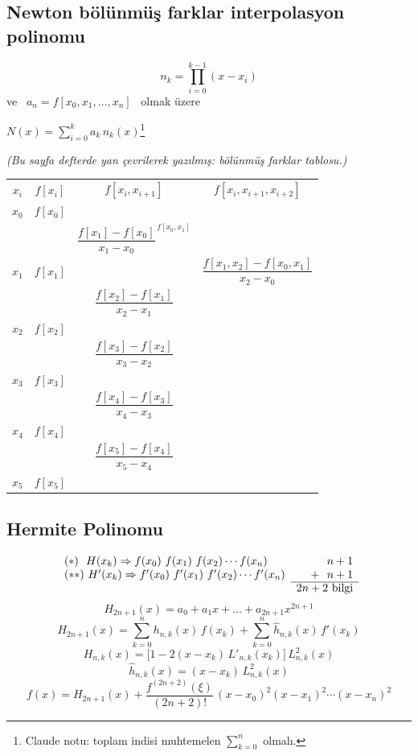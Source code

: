 \documentclass[11pt,a4paper]{article}
\begin{document}
\subsection{Newton bölünmüş farklar interpolasyon polinomu}
\[ n_k = \prod_{i=0}^{k-1} (x - x_i) \]
ve \ $a_n = f[x_0, x_1, \dots, x_n]$ \ olmak üzere
\begin{center}
  $\displaystyle N(x) = \sum_{i=0}^{k} a_k\, n_k(x)$\footnote{Claude notu: toplam indisi muhtemelen
  $\sum_{k=0}^{n}$ olmalı.}
\end{center}

\noindent{}\textit{(Bu sayfa defterde yan çevrilerek yazılmış: bölünmüş farklar tablosu.)}
\begin{center}
  {\renewcommand\arraystretch{1.6}
  \begin{tabular}{cccc}
    $x_i$ & $f[x_i]$ & $f[x_i, x_{i+1}]$ & $f[x_i, x_{i+1}, x_{i+2}]$ \\
    $x_0$ & $f[x_0]$ & & \\
      & & $\boxed{\dfrac{f[x_1] - f[x_0]}{x_1 - x_0}}^{\,f[x_0, x_1]}$ & \\
    $x_1$ & $f[x_1]$ & & $\dfrac{f[x_1, x_2] - f[x_0, x_1]}{x_2 - x_0}$ \\
      & & $\dfrac{f[x_2] - f[x_1]}{x_2 - x_1}$ & \\
    $x_2$ & $f[x_2]$ & & \\
      & & $\dfrac{f[x_3] - f[x_2]}{x_3 - x_2}$ & \\
    $x_3$ & $f[x_3]$ & & \\
      & & $\dfrac{f[x_4] - f[x_3]}{x_4 - x_3}$ & \\
    $x_4$ & $f[x_4]$ & & \\
      & & $\dfrac{f[x_5] - f[x_4]}{x_5 - x_4}$ & \\
    $x_5$ & $f[x_5]$ & &
  \end{tabular}}
\end{center}

\subsection{Hermite Polinomu}
\[
  \begin{array}{lr}
    (*)\ \ H(x_k) \Rightarrow f(x_0)\ f(x_1)\ f(x_2) \cdots f(x_n) & n+1 \\
    (**)\ H'(x_k) \Rightarrow f'(x_0)\ f'(x_1)\ f'(x_2) \cdots f'(x_n) & +\ \ n+1 \\ \cline{2-2}
    & 2n+2 \text{ bilgi}
  \end{array}
\]
\[ H_{2n+1}(x) = a_0 + a_1 x + \dots + a_{2n+1} x^{2n+1} \]
\[
  H_{2n+1}(x) = \sum_{k=0}^{n} h_{n,k}(x)\, f(x_k) + \sum_{k=0}^{n} \hat{h}_{n,k}(x)\, f'(x_k)
\]
\[ H_{n,k}(x) = \bigl[1 - 2(x - x_k)\, L'_{n,k}(x_k)\bigr]\, L^2_{n,k}(x) \]
\[ \hat{h}_{n,k}(x) = (x - x_k)\, L^2_{n,k}(x) \]
\[
  f(x) = H_{2n+1}(x) + \frac{f^{(2n+2)}(\xi)}{(2n+2)!}\,(x - x_0)^2 (x - x_1)^2 \cdots (x - x_n)^2
\]
\end{document}
